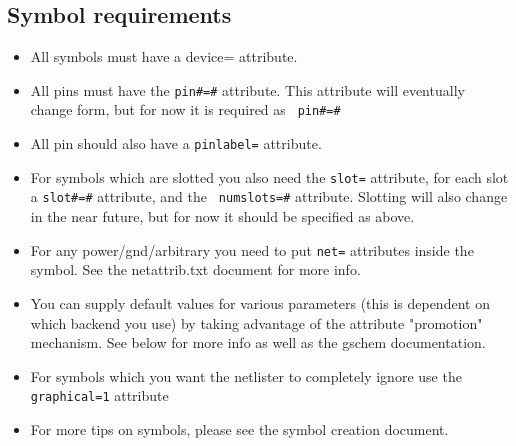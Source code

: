\documentclass{article}
\begin{document}
\subsection{Symbol requirements}
\begin{itemize}
\item All symbols must have a device= attribute.
  
\item All pins must have the {\tt pin\#=\#} attribute.  This attribute
  will eventually change form, but for now it is required as {\tt
    pin\#=\#}

\item All pin should also have a {\tt pinlabel=} attribute.
  
\item For symbols which are slotted you also need the {\tt slot=}
  attribute, for each slot a {\tt slot\#=\#} attribute, and the {\tt
    numslots=\#} attribute.  Slotting will also change in the near
  future, but for now it should be specified as above.
  
\item For any power/gnd/arbitrary you need to put {\tt net=}
  attributes inside the symbol.  See the netattrib.txt document for
  more info.
  
\item You can supply default values for various parameters (this is
  dependent on which backend you use) by taking advantage of the
  attribute "promotion" mechanism.  See below for more info as well as
  the gschem documentation.
  
\item For symbols which you want the netlister to completely ignore
  use the {\tt graphical=1} attribute

\item For more tips on symbols, please see the symbol creation document.
\end{itemize}
\end{document}
